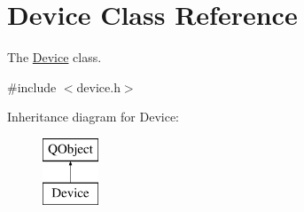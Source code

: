 \hypertarget{classDevice}{\section{Device Class Reference}
\label{classDevice}
}


The \hyperlink{classDevice}{Device} class.  




{\ttfamily \#include $<$device.\-h$>$}

Inheritance diagram for Device\-:\begin{figure}[H]
\begin{center}
\leavevmode
\includegraphics[height=2.000000cm]{classDevice}
\end{center}
\end{figure}
